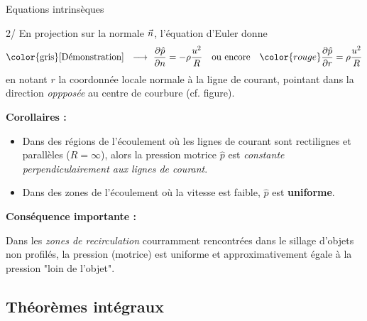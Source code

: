 \begin{frame}{Equations intrinsèques }
\pause

\smallskip

2/ En projection sur la normale $\vec{n}$, l'équation d'Euler
donne
\[
  \mbox{\color{gris} [Démonstration] \; $\longrightarrow$ \;}
  \frac{\partial \hat{p}}{\partial n} = - \rho \frac{u^2}{R}
  \quad \mbox{ou encore} \quad
  \color{rouge}
  \frac{\partial \hat{p}}{\partial r} = \rho \frac{u^2}{R}
\]
en notant $r$ la coordonnée locale normale à la ligne de courant, pointant
dans la direction \textsl{oppposée} au centre de courbure (cf. figure). 

\pause

\medskip

{\bf Corollaires  :}

\begin{itemize}

\item 
Dans des régions de l'écoulement o\`u les lignes de courant sont rectilignes et parallèles 
($R=\infty$), alors la pression motrice $\hat{p}$ est \textsl{constante perpendiculairement aux lignes de courant}. 

\item Dans des zones de l'écoulement où la vitesse est faible, $\hat{p}$ est {\bf uniforme}.
\end{itemize}

\pause

\smallskip

{\bf Conséquence importante :}

Dans les {\em zones de recirculation} courramment rencontrées dans le sillage d'objets non profilés, la pression (motrice) est uniforme et approximativement égale à la pression "loin de l'objet". 


\vspace{0mm}

\end{frame}


\subsection{Théorèmes intégraux}




